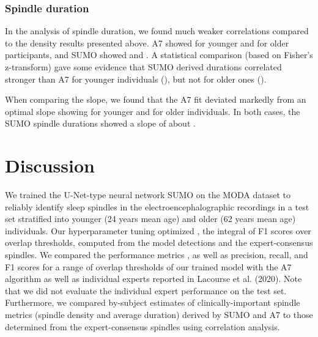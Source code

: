 \documentclass[fleqn,twocolumn,10pt]{wlscirep}
\newcommand{\Fmean}{}
\begin{document}
\subsubsection{Spindle duration}

In the analysis of spindle duration, we found much weaker correlations compared
to the density results presented above.  A7 showed  for younger and
 for older participants, and SUMO showed  and .
A statistical comparison (based on Fisher's z-transform) gave some evidence that
SUMO derived durations correlated stronger than A7 for younger individuals
(), but not for older ones ().

When comparing the slope, we found that the A7 fit deviated markedly from an
optimal slope showing  for younger and  for older individuals.
In both cases, the SUMO spindle durations showed a slope of about .

 
\section{Discussion}
\label{sec:discussion}

We trained the U-Net-type neural network SUMO on the MODA dataset to reliably
identify sleep spindles in the electroencephalographic recordings in a test set
stratified into younger (24 years mean age) and older (62 years mean age)
individuals.
Our hyperparameter tuning optimized \Fmean{}, the integral of F1 scores over
overlap thresholds, computed from the model detections and the
expert-consensus spindles.
We compared the performance metrics \Fmean{}, as well as precision, recall, and
F1 scores for a range of overlap thresholds of our trained model with the A7
algorithm as well as individual experts reported in Lacourse et
al. (2020)\cite{Lacourse2020}.
Note that we did not evaluate the individual expert performance on the test set.
Furthermore, we compared by-subject estimates of clinically-important spindle
metrics (spindle density and average duration) derived by SUMO and A7 to
those determined from the expert-consensus spindles using correlation analysis.
\end{document}
